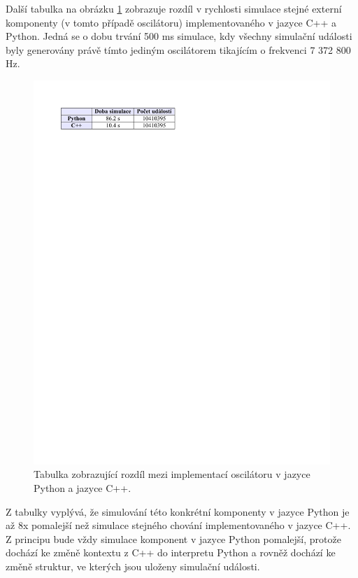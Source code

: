 Další tabulka na obrázku \ref{fig:tabulka3} zobrazuje rozdíl v rychlosti simulace stejné externí komponenty (v tomto případě oscilátoru) implementovaného v jazyce C++ a Python. Jedná se o dobu trvání 500 ms simulace, kdy všechny simulační události byly generovány právě tímto jediným oscilátorem tikajícím o frekvenci 7 372 800 Hz.

\begin{figure}[ht]
\centering
\includegraphics[trim=-2cm 24.5cm 5cm 2cm]{fig/tabulka3}
\caption{Tabulka zobrazující rozdíl mezi implementací oscilátoru v jazyce Python a jazyce C++.}
\label{fig:tabulka3}
\end{figure}

Z tabulky vyplývá, že simulování této konkrétní komponenty v jazyce Python je až 8x pomalejší než simulace stejného chování implementovaného v jazyce C++. Z principu bude vždy simulace komponent v jazyce Python pomalejší, protože dochází ke změně kontextu z C++ do interpretu Python a rovněž dochází ke změně struktur, ve kterých jsou uloženy simulační události.

